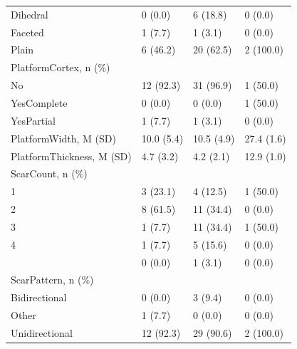 \documentclass[12pt,twoside]{reedthesis}
\begin{document}
\begin{longtable}[t]{llll}
Dihedral & 0 (0.0) & 6 (18.8) & 0 (0.0)\\
Faceted & 1 (7.7) & 1 (3.1) & 0 (0.0)\\
Plain & 6 (46.2) & 20 (62.5) & 2 (100.0)\\
PlatformCortex, n (\%) &  &  & \\
\addlinespace
No & 12 (92.3) & 31 (96.9) & 1 (50.0)\\
YesComplete & 0 (0.0) & 0 (0.0) & 1 (50.0)\\
YesPartial & 1 (7.7) & 1 (3.1) & 0 (0.0)\\
PlatformWidth, M (SD) & 10.0 (5.4) & 10.5 (4.9) & 27.4 (1.6)\\
PlatformThickness, M (SD) & 4.7 (3.2) & 4.2 (2.1) & 12.9 (1.0)\\
\addlinespace
ScarCount, n (\%) &  &  & \\
1 & 3 (23.1) & 4 (12.5) & 1 (50.0)\\
2 & 8 (61.5) & 11 (34.4) & 0 (0.0)\\
3 & 1 (7.7) & 11 (34.4) & 1 (50.0)\\
4 & 1 (7.7) & 5 (15.6) & 0 (0.0)\\
\addlinespace
7 & 0 (0.0) & 1 (3.1) & 0 (0.0)\\
ScarPattern, n (\%) &  &  & \\
Bidirectional & 0 (0.0) & 3 (9.4) & 0 (0.0)\\
Other & 1 (7.7) & 0 (0.0) & 0 (0.0)\\
Unidirectional & 12 (92.3) & 29 (90.6) & 2 (100.0)\\
\bottomrule
\end{longtable}
\begin{table}

\caption{\label{tab:unnamed-chunk-75}Terminal Gravettian Blank measurements (width, length and thickness) with mean and standard deviation values.}
\centering
{}
\end{table}
\end{document}
